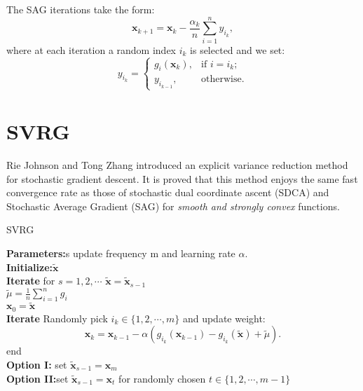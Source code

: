 \documentclass[11pt]{article} %
\begin{document}
\begin{algorithm}[htb]
The SAG iterations take the form:
$${\textbf{x}}_{k+1}={\textbf{x}}_k - \frac{{\alpha}_k }{n}\sum _{i=1}^{n}y_{i_k} ,$$
where at each iteration a random index $i_k$ is selected and we set:
$$y_{i_k}=
\begin{cases}
g_{i}({\textbf{x}}_k),  & \text{if $i=i_k$}; \\
y_{i_{k-1}}, & \text{otherwise}.
\end{cases}$$

\section{SVRG}%
Rie Johnson and Tong Zhang introduced an explicit variance reduction method for stochastic gradient descent.
It is proved that this method enjoys the same fast convergence rate as those of stochastic dual coordinate ascent (SDCA) and Stochastic Average Gradient (SAG) for \emph{smooth and strongly convex} functions.
%
%
%

\begin{algorithm}[t]
\caption{SVRG}
\textbf{Parameters:}s update frequency m and learning rate $\alpha$.\\
\textbf{Initialize:}$\tilde{\textbf{x}}$\\
\textbf{Iterate} for $s = 1,2,\cdots $
    $\tilde{\textbf{x}}={\tilde{\textbf{x}}_{s-1}}$\\
    $\tilde{\mu}=\frac{1}{n}\sum_{i=1}^{n} g_i $\\
    ${\textbf{x}}_{0}=\tilde{\textbf{x}} $\\
    \textbf{Iterate} Randomly pick $i_k \in \{1,2,\cdots, m\}$ and update weight: $${\textbf{x}}_k={\textbf{x}}_{k-1}-\alpha(g_{i_k}({\textbf{x}}_{k-1})-g_{i_k}(\tilde{\textbf{x}})+\tilde{\mu}).$$
  end\\
 \textbf{Option I:} set ${\tilde{\textbf{x}}}_{s-1}={\textbf{x}}_m$\\
 \textbf{Option II:}set  ${\tilde{\textbf{x}}}_{s-1}={\textbf{x}}_t$ for randomly chosen $t\in\{1,2,\cdots,m-1\}$


\end{algorithm}
\end{algorithm}
\end{document}
